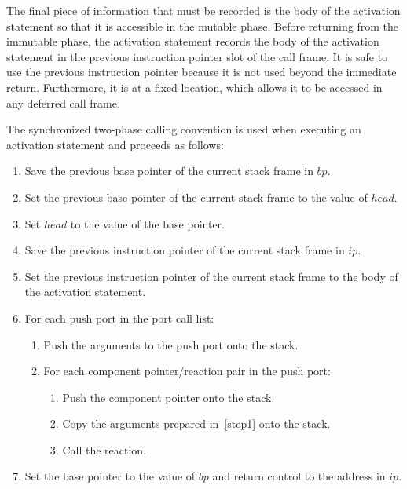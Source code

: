 The final piece of information that must be recorded is the body of the activation statement so that it is accessible in the mutable phase.
Before returning from the immutable phase, the activation statement records the body of the activation statement in the previous instruction pointer slot of the call frame.
It is safe to use the previous instruction pointer because it is not used beyond the immediate return.
Furthermore, it is at a fixed location, which allows it to be accessed in any deferred call frame.

The synchronized two-phase calling convention is used when executing an activation statement and proceeds as follows:
\begin{enumerate}
\item Save the previous base pointer of the current stack frame in $bp$.
\item Set the previous base pointer of the current stack frame to the value of $head$.
\item Set $head$ to the value of the base pointer.
\item Save the previous instruction pointer of the current stack frame in $ip$.
\item Set the previous instruction pointer of the current stack frame to the body of the activation statement.
\item For each push port in the port call list:
  \begin{enumerate}
  \item Push the arguments to the push port onto the stack.\label{step1}
  \item For each component pointer/reaction pair in the push port:
    \begin{enumerate}
    \item Push the component pointer onto the stack.
    \item Copy the arguments prepared in~\ref{step1} onto the stack.
    \item Call the reaction.
    \end{enumerate}
  \end{enumerate}
\item Set the base pointer to the value of $bp$ and return control to the address in $ip$.
\end{enumerate}

